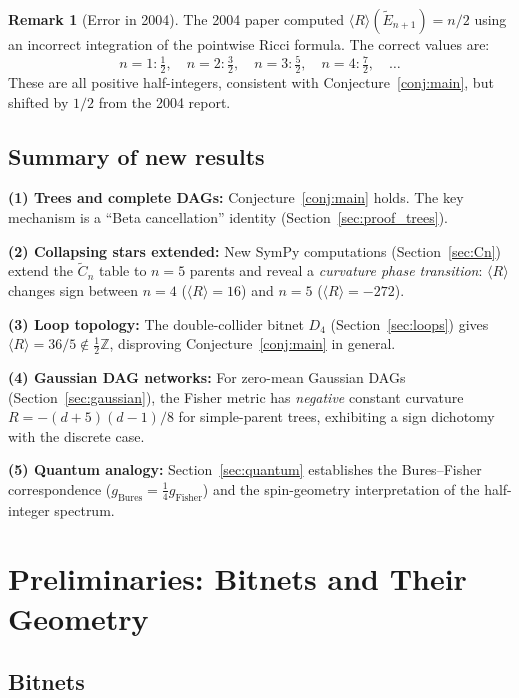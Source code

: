 \documentclass[11pt]{article}
\theoremstyle{definition}
\newtheorem{remark}[theorem]{Remark}
\begin{document}
\begin{remark}[Error in 2004]
The 2004 paper computed $\langle R\rangle(\tilde{E}_{n+1}) = n/2$ 
using an incorrect integration of the pointwise Ricci formula.  
The correct values are:
\[
  n=1: \tfrac{1}{2}, \quad n=2: \tfrac{3}{2}, \quad n=3: \tfrac{5}{2}, \quad 
  n=4: \tfrac{7}{2}, \quad \ldots
\]
These are all positive half-integers, consistent with Conjecture~\ref{conj:main}, 
but shifted by $1/2$ from the 2004 report.
\end{remark}

\subsection{Summary of new results}

\textbf{(1) Trees and complete DAGs:} Conjecture~\ref{conj:main} holds.  
The key mechanism is a ``Beta cancellation'' identity (Section~\ref{sec:proof_trees}).

\textbf{(2) Collapsing stars extended:} New SymPy computations 
(Section~\ref{sec:Cn}) extend the $\tilde{C}_n$ table to $n=5$ parents and 
reveal a \emph{curvature phase transition}: $\langle R\rangle$ changes sign 
between $n=4$ ($\langle R\rangle=16$) and $n=5$ ($\langle R\rangle=-272$).

\textbf{(3) Loop topology:} The double-collider bitnet $D_4$ 
(Section~\ref{sec:loops}) gives $\langle R\rangle = 36/5 \notin \tfrac{1}{2}\mathbb{Z}$, 
disproving Conjecture~\ref{conj:main} in general.

\textbf{(4) Gaussian DAG networks:} For zero-mean Gaussian DAGs 
(Section~\ref{sec:gaussian}), the Fisher metric has \emph{negative} 
constant curvature $R = -(d+5)(d-1)/8$ for simple-parent trees, 
exhibiting a sign dichotomy with the discrete case.

\textbf{(5) Quantum analogy:} Section~\ref{sec:quantum} establishes 
the Bures--Fisher correspondence ($g_{\text{Bures}} = \tfrac{1}{4}g_{\text{Fisher}}$) 
and the spin-geometry interpretation of the half-integer spectrum.

\section{Preliminaries: Bitnets and Their Geometry}

\subsection{Bitnets}
\end{document}
